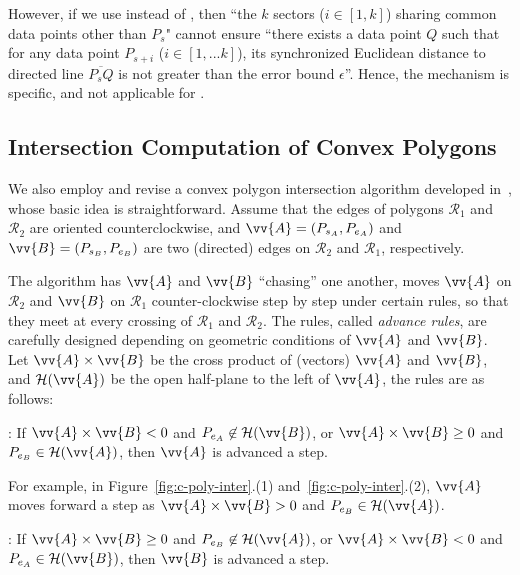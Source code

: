 However, if we use \sed instead of \ped, then  ``the $k$ sectors  ($i\in[1,k]$) sharing common data points other than $P_s$" cannot ensure ``there exists a data point $Q$ such that for any data point $P_{s+i}$ ($i \in [1, ... k]$), its synchronized Euclidean distance to directed line $\overline{P_sQ}$ is not greater than the error bound $\epsilon$''.
Hence, the \cia mechanism is \ped specific, and not applicable for \sed.







\subsection{Intersection Computation of Convex Polygons}
\label{subsec-cpi}

We also employ and revise a convex polygon intersection algorithm developed in~\cite{ORourke:Intersection}, whose basic idea is straightforward.
Assume \kwlog that the edges of polygons $\mathcal{R}_1$ and $\mathcal{R}_2$ are oriented counterclockwise, and $\vv{A} = (P_{s_A}, P_{e_A})$ and $\vv{B} = (P_{s_B}, P_{e_B})$ are two (directed) edges on $\mathcal{R}_2$ and $\mathcal{R}_1$, respectively.


The algorithm has $\vv{A}$ and $\vv{B}$ ``chasing'' one another, \ie moves $\vv{A}$ on $\mathcal{R}_2$ and $\vv{B}$ on $\mathcal{R}_1$ counter-clockwise step by step under certain rules, so that they meet at every crossing of $\mathcal{R}_1$ and $\mathcal{R}_2$.
%
The rules, called \emph{advance rules}, are carefully designed depending on geometric conditions of $\vv{A}$ and $\vv{B}$.
Let $\vv{A} \times \vv{B}$ be the cross product of (vectors) $\vv{A}$ and $\vv{B}$, and $\mathcal{H}(\vv{A})$ be the open half-plane to the left of $\vv{A}$, the rules are as follows:

: If $\vv{A} \times \vv{B} < 0$ and $P_{e_A} \not \in \mathcal{H}(\vv{B})$, or $\vv{A} \times \vv{B} \ge 0$ and $P_{e_B} \in \mathcal{H}(\vv{A})$, then $\vv{A}$ is advanced a step.

For example, in Figure~\ref{fig:c-poly-inter}.(1) and~\ref{fig:c-poly-inter}.(2), $\vv{A}$ moves forward a step as  $\vv{A} \times \vv{B} > 0$ and $P_{e_B} \in \mathcal{H}(\vv{A})$.

: If $\vv{A} \times \vv{B} \ge 0$ and $P_{e_B} \not \in \mathcal{H}(\vv{A})$, or $\vv{A} \times \vv{B} < 0$ and $P_{e_A} \in \mathcal{H}(\vv{B})$, then  $\vv{B}$ is advanced a step.


